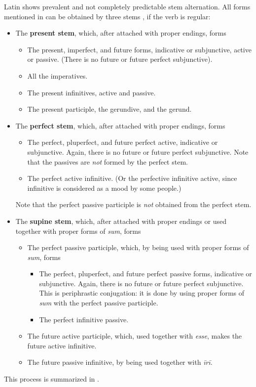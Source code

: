 \documentclass[UTF8, a4paper, oneside]{report}
\newcommand*{\citesec}[1]{\S~{#1}}
\newcommand*{\concept}[1]{\textbf{#1}}
\newcommand{\corpus}[1]{\emph{#1}}
\begin{document}
Latin shows prevalent and not completely predictable stem alternation.
All forms mentioned in 
can be obtained by three stems \citep[\citesec{164}]{allen1903allen},
if the verb is regular:
\begin{itemize}
    \item The \concept{present stem}, which, after attached with proper endings, forms
    \begin{itemize}
        \item The \acl{present}, \acl{imperfect}, and future forms, indicative or subjunctive,
        active or passive. (There is no future or future perfect subjunctive).
        \item All the imperatives.
        \item The present infinitives, active and passive.
        \item The present participle, the gerundive, and the gerund.
    \end{itemize}
    \item The \concept{perfect stem}, which, after attached with proper endings, forms 
    \begin{itemize}
        \item The perfect, pluperfect, and future perfect active, indicative or subjunctive.
        Again, there is no future or future perfect subjunctive.
        Note that the passives are \emph{not} formed by the perfect stem.
        \item The perfect active infinitive. 
        (Or the perfective infinitive active, since infinitive is considered as a mood by some people.)
    \end{itemize}
    Note that the perfect passive participle is \emph{not} obtained from the perfect stem.
    \item The \concept{supine stem}, 
    which, after attached with proper endings or used together with proper forms of \corpus{sum},
    forms 
    \begin{itemize}
        \item The perfect passive participle, which, by being used with proper forms of \corpus{sum}, forms
        \begin{itemize}
            \item The perfect, pluperfect, and future perfect passive forms, indicative or subjunctive.
            Again, there is no future or future perfect subjunctive.
            This is periphrastic conjugation: it is done by using proper forms of \corpus{sum}
            with the perfect passive participle.
            \item The perfect infinitive passive.
        \end{itemize}
        \item The future active participle, which, used together with \corpus{esse},
        makes the future active infinitive.
        \item The future passive infinitive, by being used together with \corpus{īrī}.
    \end{itemize}
\end{itemize}
This process is summarized in .
\end{document}
